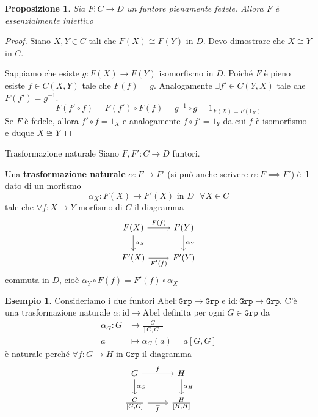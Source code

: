 \documentclass[notitlepage]{report}
\newcounter{theo}[section]\setcounter{theo}{0}
\newcounter{excounter}[section]\setcounter{excounter}{0}
\numberwithin{equation}{section}
\theoremstyle{plain}
\newtheorem{proposition}[theo]{Proposizione}
\theoremstyle{definition}
\newtheorem{example}[excounter]{Esempio}
\theoremstyle{remark}
\begin{document}
\begin{proposition}{}
    Sia \(F: C \to D\) un funtore pienamente fedele. Allora \(F\) è
    essenzialmente iniettivo
\end{proposition}
\begin{proof}{}
    Siano \(X, Y \in C\) tali che \(F{(X)} \cong F{(Y)}\) in \(D\). Devo
    dimostrare che \(X \cong Y\) in \(C\).

    Sappiamo che esiste \(g : F{(X)} \to F{(Y)}\) isomorfismo in \(D\). Poiché
    \(F\) è pieno esiste \(f \in C{(X, Y)}\) tale che \(F{(f)} = g\).
    Analogamente \(\exists f' \in C{(Y, X)}\) tale che \(F{(f')} = g^{-1}\).
    \[
      F{(f' \circ f)} = F{(f')} \circ F{(f)} = g^{-1} \circ g = 1_{F{(X)} = F{(1_X)}} 
    \]
    Se \(F\) è fedele, allora \(f' \circ f = 1_X\)  e analogamente \(f \circ f' = 1_Y\) da cui \(f\) è isomorfismo e duque \(X \cong Y\) 
\end{proof}

\begin{definition}{Trasformazione naturale}
    Siano \(F, F' : C \to D\) funtori.

    Una \textbf{trasformazione naturale} \(\alpha : F \to F'\) (si può anche
    scrivere \(\alpha : F \implies F'\)) è il dato di un morfismo
    \[
      \alpha_X : F{(X)} \to F'{(X)} \text{ in \(D\) } \forall X \in C
    \]
    tale che \(\forall f : X \to Y\) morfismo di \(C\) il diagramma
\[\begin{tikzcd}
	{F(X)} & {F(Y)} \\
	{F'(X)} & {F'(Y)}
	\arrow["{F(f)}", from=1-1, to=1-2]
	\arrow["{\alpha_X}", from=1-1, to=2-1]
	\arrow["{\alpha_Y}", from=1-2, to=2-2]
	\arrow["{F'(f)}"', from=2-1, to=2-2]
\end{tikzcd}\]
    commuta in \(D\), cioè \(\alpha_Y \circ F{(f)} = F'{(f)} \circ \alpha_X\) 
\end{definition}

\begin{example}{}
    Consideriamo i due funtori \(\mathrm{Abel} : \mathtt{Grp} \to \mathtt{Grp}\) e \(\mathrm{id} : \mathtt{Grp} \to \mathtt{Grp}\). 
    C'è una trasformazione naturale \(\alpha : \mathrm{id} \to \mathrm{Abel}\)
    definita per ogni \(G \in \mathtt{Grp}\) da 
    \begin{align*}
        \alpha_G: G &\longrightarrow \frac{G}{[G, G]} \\
        a &\longmapsto \alpha_G(a) = a[G, G]
    \end{align*}
    è naturale perché \(\forall f : G \to H\) in \(\mathtt{Grp}\) il diagramma
\[\begin{tikzcd}
	{G} & {H} \\
    {\frac{G}{[G,G]}} & {\frac{H}{[H,H]}}
	\arrow["f", from=1-1, to=1-2]
	\arrow["{\alpha_G}", from=1-1, to=2-1]
	\arrow["{\alpha_H}", from=1-2, to=2-2]
	\arrow["\overline{f}"', from=2-1, to=2-2]
\end{tikzcd}\]
\end{example}
\end{document}
